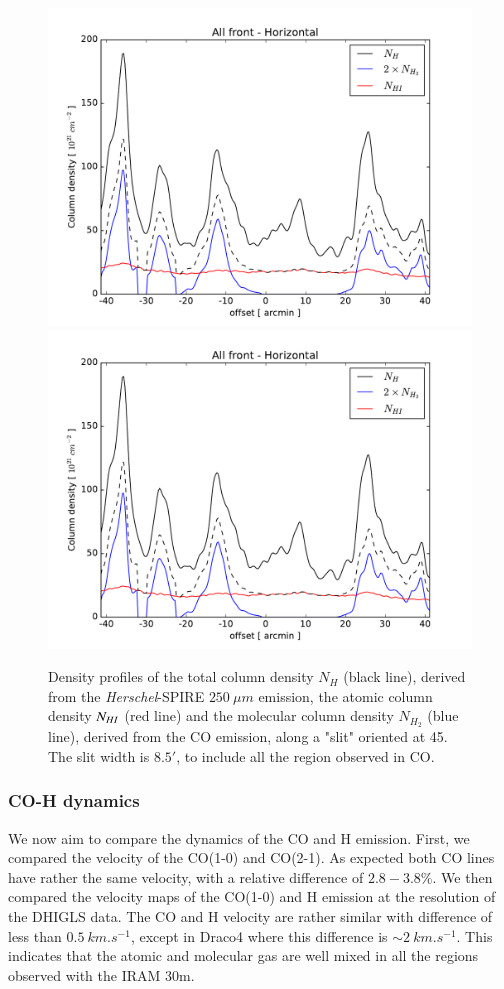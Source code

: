 \documentclass[traditabstract]{aa}
\begin{document}
\begin{figure}[h!]
  \centering
  \includegraphics[page=1,width=0.49\linewidth,trim=25 10 55 25,clip=true]{Figures/Column_density_profiles.pdf}
  \includegraphics[page=4,width=0.49\linewidth,trim=25 10 55 25,clip=true]{Figures/Column_density_profiles.pdf}
  \caption{\label{Col_density} Density profiles of the total column density $N_H$ (black line), derived from the \emph{Herschel}-SPIRE $250\: \mu m$ emission, the atomic column density $N_{H\rmnum{1}}$ (red line) and the molecular column density $N_{H_2}$ (blue line), derived from the CO emission, along a "slit" oriented at 45\degree. The slit width is $8.5'$, to include all the region observed in CO.}
\end{figure}


      \subsubsection{CO-H dynamics}

   We now aim to compare the dynamics of the CO and H emission. First, we compared the velocity of the CO(1-0) and CO(2-1). As expected both CO lines have rather the same velocity, with a relative difference of $2.8-3.8\%$. We then compared the velocity maps of the CO(1-0) and H emission at the resolution of the DHIGLS data. The CO and H velocity are rather similar with difference of less than $0.5\: km.s^{-1}$, except in Draco4 where this difference is $\sim 2\: km.s^{-1}$. This indicates that the atomic and molecular gas are well mixed in all the regions observed with the IRAM 30m.
\end{document}
